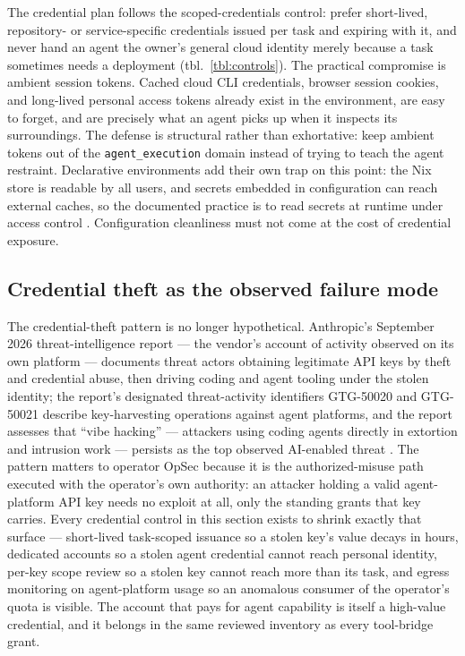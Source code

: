\documentclass[
  english,
  9pt,
]{extarticle}
\begin{document}
The credential plan follows the scoped-credentials control: prefer
short-lived, repository- or service-specific credentials issued per task
and expiring with it, and never hand an agent the owner's general cloud
identity merely because a task sometimes needs a deployment
(tbl.~\ref{tbl:controls}). The practical compromise is ambient session
tokens. Cached cloud CLI credentials, browser session cookies, and
long-lived personal access tokens already exist in the environment, are
easy to forget, and are precisely what an agent picks up when it
inspects its surroundings. The defense is structural rather than
exhortative: keep ambient tokens out of the \texttt{agent\_execution}
domain instead of trying to teach the agent restraint. Declarative
environments add their own trap on this point: the Nix store is readable
by all users, and secrets embedded in configuration can reach external
caches, so the documented practice is to read secrets at runtime under
access control \citep{nix_store_secrets}. Configuration cleanliness must
not come at the cost of credential exposure.

\subsection{Credential theft as the observed failure
mode}\label{credential-theft-as-the-observed-failure-mode}

The credential-theft pattern is no longer hypothetical. Anthropic's
September 2026 threat-intelligence report --- the vendor's account of
activity observed on its own platform --- documents threat actors
obtaining legitimate API keys by theft and credential abuse, then
driving coding and agent tooling under the stolen identity; the report's
designated threat-activity identifiers GTG-50020 and GTG-50021 describe
key-harvesting operations against agent platforms, and the report
assesses that ``vibe hacking'' --- attackers using coding agents
directly in extortion and intrusion work --- persists as the top
observed AI-enabled threat \citep{anthropic_ti_sept_2026}. The pattern
matters to operator OpSec because it is the authorized-misuse path
executed with the operator's own authority: an attacker holding a valid
agent-platform API key needs no exploit at all, only the standing grants
that key carries. Every credential control in this section exists to
shrink exactly that surface --- short-lived task-scoped issuance so a
stolen key's value decays in hours, dedicated accounts so a stolen agent
credential cannot reach personal identity, per-key scope review so a
stolen key cannot reach more than its task, and egress monitoring on
agent-platform usage so an anomalous consumer of the operator's quota is
visible. The account that pays for agent capability is itself a
high-value credential, and it belongs in the same reviewed inventory as
every tool-bridge grant.
\end{document}
